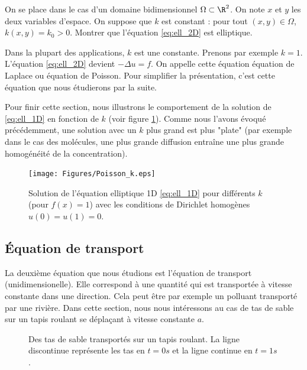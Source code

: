 \documentclass[12pt,a4paper,twoside]{article}
\begin{document}
\begin{exercise}
  On se place dans le cas d'un domaine bidimensionnel $\Omega \subset \R^2$.
  On note $x$ et $y$ les deux variables d'espace.
  On suppose que $k$ est constant : pour tout $(x,y) \in \Omega$,
  $k(x,y) = k_0 > 0$.
  Montrer que l'\'equation \eqref{eq:ell_2D} est elliptique.
\end{exercise}

\begin{remark}
  Dans la plupart des applications, $k$ est une constante.
  Prenons par exemple $k=1$.
  L'\'equation \eqref{eq:ell_2D} devient $-\Delta u = f$.
  On appelle cette \'equation \'equation de Laplace ou 
  \'equation de Poisson.
  Pour simplifier la pr\'esentation, c'est cette \'equation que nous \'etudierons
  par la suite.
\end{remark}


Pour finir cette section, nous illustrons le comportement
de la solution de \eqref{eq:ell_1D} en fonction de $k$
(voir figure \ref{fig:ell_k}).
Comme nous l'avons \'evoqu\'e pr\'ec\'edemment, une solution avec 
un $k$ plus grand est plus "plate" 
(par exemple dans le cas des mol\'ecules, une plus grande diffusion entra\^ine 
une plus grande homog\'en\'eit\'e de la concentration).


\begin{figure}[h]
  \centering
  \texttt{[image: Figures/Poisson\_k.eps]}
  \caption{Solution de l'\'equation elliptique 1D \eqref{eq:ell_1D}
  pour diff\'erents $k$ (pour $f(x)=1$) avec les conditions de Dirichlet homog\`enes
  $u(0) = u(1) = 0$.}
  \label{fig:ell_k}
\end{figure}


\subsection{\'Equation de transport}

La deuxi\`eme \'equation que nous \'etudions est l'\'equation de transport
(unidimensionelle).
Elle correspond \`a une quantit\'e qui est transport\'ee \`a vitesse
constante dans une direction.
Cela peut \^etre par exemple un polluant transport\'e par une rivi\`ere.
Dans cette section, nous nous int\'eressons au cas de tas de sable
sur un tapis roulant se d\'epla\c{c}ant \`a vitesse constante $a$.


\begin{figure}
\centering
\begin{tikzpicture}[scale = 0.5]
  
\end{tikzpicture}
\caption{Des tas de sable transport\'es sur un tapis roulant.
  La ligne discontinue repr\'esente les tas en $t=0s$ et la ligne
  continue en $t=1s$.}
\label{fig:transport}
\end{figure}
\end{document}
